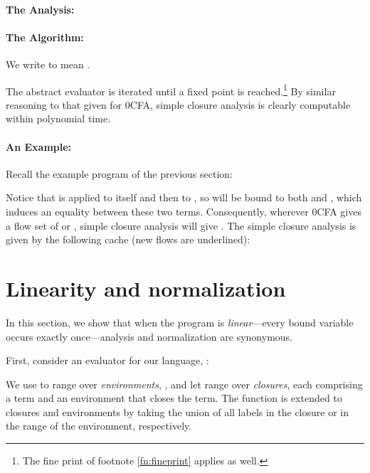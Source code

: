 \documentclass{llncs}
\begin{document}
\paragraph{The Analysis:} 



\paragraph{The Algorithm:} 

We write  to mean
.


The abstract evaluator  is iterated until a fixed point is
reached.\footnote{The fine print of footnote \ref{fn:fineprint}
applies as well.}  By similar reasoning to that given for 0CFA, simple
closure analysis is clearly computable within polynomial time.

\paragraph{An Example:}

Recall the example program of the previous section:


Notice that  is applied to itself and then to , so  will be bound to both  and ,
which induces an equality between these two terms.  Consequently,
wherever 0CFA gives a flow set of  or , simple closure analysis will give .
The simple closure analysis is given by the following cache (new flows
are underlined):






\section{Linearity and normalization}
\label{sec:linearity}

In this section, we show that when the program is {\em linear}---every
bound variable occurs exactly once---analysis and normalization are
synonymous.

First, consider an evaluator for our language, :



We use  to range over {\em environments}, , and let  range over {\em
closures}, each comprising a term and an environment that closes the
term.  The function  is extended to closures and
environments by taking the union of all labels in the closure or in
the range of the environment, respectively.
\end{document}
